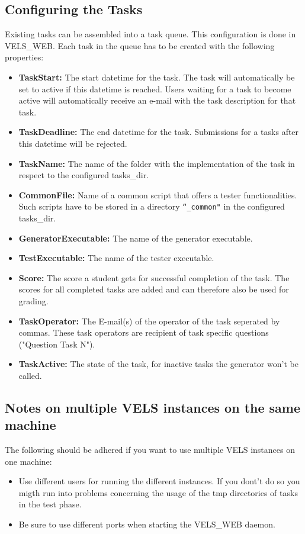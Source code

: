 \subsection{Configuring the Tasks} \label{sub:configTasks}
Existing tasks can be assembled into a task queue. This configuration is done in VELS\_WEB.
Each task in the queue has to be created with the following properties:
\begin{itemize}
\item {\bf TaskStart:} The start datetime for the task. The task will automatically
    be set to active if this datetime is reached. Users waiting for a task to become
    active will automatically receive an e-mail with the task description for that task.
\item {\bf TaskDeadline:} The end datetime for the task. Submissions for a tasks after
    this datetime will be rejected.
\item {\bf TaskName:} The name of the folder with the implementation of the task in respect
	to the configured tasks\_dir.
\item {\bf CommonFile:} Name of a common script that offers a tester functionalities.
	Such scripts have to be stored in a directory {\tt ``\_common"} in the configured
	tasks\_dir.
\item {\bf GeneratorExecutable:} The name of the generator executable.
\item {\bf TestExecutable:} The name of the tester executable.
\item {\bf Score:} The score a student gets for successful completion of the task. The
    scores for all completed tasks are added and can therefore also be used for grading.
\item {\bf TaskOperator:} The E-mail(s) of the operator of the task seperated by commas. 
	These task operators are recipient of task specific questions ("Question Task N").
\item {\bf TaskActive:} The state of the task, for inactive tasks the generator won't
    be called.
\end{itemize}

\subsection{Notes on multiple VELS instances on the same machine}

The following should be adhered if you want to use multiple VELS instances on
one machine:
\begin{itemize}
\item Use different users for running the different instances. If you dont't do
	so you migth run into problems concerning the usage of the tmp directories of
	tasks in the test phase.
\item Be sure to use different ports when starting the VELS\_WEB daemon.
\end{itemize}

